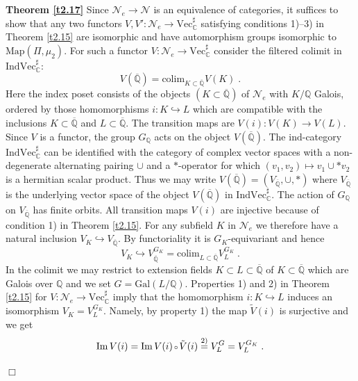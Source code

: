 \documentclass[12pt,leqno]{article}
\newcommand{\C}{{\mathbb{C}}}
\newcommand{\Q}{{\mathbb{Q}}}
\newcommand{\oQ}{\overline{\Q}}
\newcommand{\Map}{\mathrm{Map}}
\newcommand{\Gal}{\mathrm{Gal}}
\newcommand{\Imm}{\mathrm{Im}\,}
\newcommand{\ind}{\mathrm{ind}}
\newcommand{\nVec}{\mathrm{Vec}}
\newcommand{\Nh}{{\mathcal N}}
\newcommand{\tV}{\tilde{V}}
\newcommand{\colim}{\mathrm{colim}}
\newcommand{\Ind}{\mathrm{Ind}}
\newenvironment{proofof}{\noindent {\bf Proof of}}{\mbox{}\hspace*{\fill}$\Box$}
\newcommand{\verk}{\mbox{\scriptsize $\,\circ\,$}}
\begin{document}
\begin{proofof} \textbf{Theorem \ref{t2.17}}
Since $\Nh_e \to \Nh$ is an equivalence of categories, it suffices to show that any two functors $V , V' : \Nh_e \to \nVec^{\sharp}_{\C}$ satisfying conditions 1)--3) in Theorem \ref{t2.15} are isomorphic and have automorphism groups isomorphic to $\Map (\Pi , \mu_2)$. For such a functor $V : \Nh_e \to \nVec^{\sharp}_{\C}$ consider the filtered  colimit in $\Ind \nVec^{\sharp}_{\C}$:
\begin{equation}
\label{eq:13}
V (\oQ) = \colim_{K \subset \oQ} V (K) \; .
\end{equation}
Here the index poset consists of the objects $(K \subset \oQ)$ of $\Nh_e$ with $K / \Q$ Galois, ordered by those homomorphisms $i : K \hookrightarrow L$ which are compatible with the inclusions $K \subset \oQ$ and $L \subset \oQ$. The transition maps are $V (i) : V (K) \to V (L)$. Since $V$ is a functor, the group $G_{\Q}$ acts on the object $V (\oQ)$. The $\ind$-category $\Ind \nVec^{\sharp}_{\C}$ can be identified with the category of complex vector spaces with a non-degenerate alternating pairing $\cup$ and a $*$-operator for which $(v_1 , v_2) \mapsto v_1 \cup * v_2$ is a hermitian scalar product. Thus we may write $V (\oQ) = (V_{\oQ} , \cup , *)$ where $V_{\oQ}$ is the underlying vector space of the object $V (\oQ)$ in $\Ind \nVec^{\sharp}_{\C}$. The action of $G_{\Q}$ on $V_{\oQ}$ has finite orbits. All transition maps $V (i)$ are injective because of condition 1) in Theorem \ref{t2.15}. For any subfield $K$ in $\Nh_e$ we therefore have a natural inclusion $V_K \hookrightarrow V_{\oQ}$. By functoriality it is $G_K$-equivariant and hence
\begin{equation}
\label{eq:14}
V_K \hookrightarrow V^{G_K}_{\oQ} = \colim_{L \subset \oQ} V^{G_K}_L \; .
\end{equation}
In the colimit we may restrict to extension fields $K \subset L \subset \oQ$ of $K \subset \oQ$ which are Galois over $\Q$ and we set $G = \Gal (L / \Q)$. Properties 1) and 2) in Theorem \ref{t2.15} for $V : \Nh_e \to \nVec^{\sharp}_{\C}$ imply that the homomorphism $i : K \hookrightarrow L$ induces an isomorphism $V_K = V^{G_K}_L$. Namely, by property 1) the map $\tV (i)$ is surjective and we get
\[
\Imm V (i) = \Imm V (i) \verk \tV (i) \overset{2)}{=} V^G_L = V^{G_K}_L \; .
\]

\end{proofof}
\end{document}
